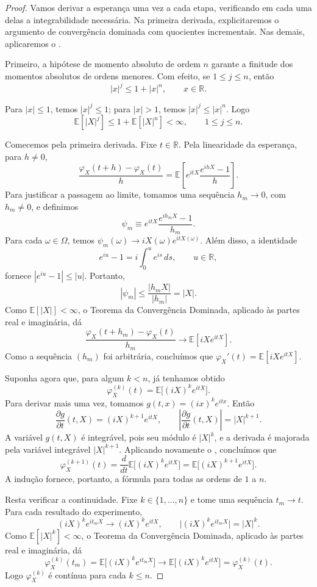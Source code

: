 \documentclass[12pt,portuguese]{article}
\theoremstyle{definition}
\theoremstyle{plainexercise}
\theoremstyle{starredexercise}
\theoremstyle{definition}
\begin{document}
\begin{proof}
Vamos derivar a esperança uma vez a cada etapa, verificando em cada
uma delas a integrabilidade necessária. Na primeira derivada, explicitaremos
o argumento de convergência dominada com quocientes incrementais.
Nas demais, aplicaremos o .

Primeiro, a hipótese de momento absoluto de ordem $n$ garante a finitude dos momentos
absolutos de ordens menores. Com efeito, se $1\leqslant j\leqslant n$, então
\[
|x|^j\leqslant1+|x|^n,\qquad x\in\mathbb{R}.
\]

Para $|x|\leqslant1$, temos $|x|^j\leqslant1$; para $|x|>1$, temos
$|x|^j\leqslant|x|^n$. Logo
\[
\mathbb{E}[|X|^j]\leqslant1+\mathbb{E}[|X|^n]<\infty,
\qquad 1\leqslant j\leqslant n.
\]

Comecemos pela primeira derivada. Fixe $t\in\mathbb{R}$.
Pela linearidade da esperança, para $h\neq0$,
\[
\frac{\varphi_X(t+h)-\varphi_X(t)}{h}
=\mathbb{E}\left[
e^{itX}\frac{e^{ihX}-1}{h}
\right].
\]
Para justificar a passagem ao limite, tomamos uma sequência
$h_m\to0$, com $h_m\neq0$, e definimos
\[
\psi_m\equiv e^{itX}\frac{e^{ih_mX}-1}{h_m}.
\]
Para cada $\omega\in\Omega$, temos
$\psi_m(\omega)\to iX(\omega)e^{itX(\omega)}$.
Além disso, a identidade
\[
e^{iu}-1=i\int_0^u e^{is}\,ds,
\qquad u\in\mathbb{R},
\]
fornece $|e^{iu}-1|\leqslant|u|$. Portanto,
\[
|\psi_m|
\leqslant\frac{|h_mX|}{|h_m|}
=|X|.
\]
Como $\mathbb{E}[|X|]<\infty$, o Teorema da Convergência Dominada, aplicado
às partes real e imaginária, dá
\[
\frac{\varphi_X(t+h_m)-\varphi_X(t)}{h_m}
\longrightarrow\mathbb{E}[iX e^{itX}].
\]
Como a sequência $(h_m)$ foi arbitrária, concluímos que
$\varphi_X'(t)=\mathbb{E}[iX e^{itX}]$.

Suponha agora que, para algum $k<n$, já tenhamos obtido
\[
\varphi_X^{(k)}(t)=\mathbb{E}\bigl[(iX)^k e^{itX}\bigr].
\]
Para derivar mais uma vez, tomamos $g(t,x)=(ix)^k e^{itx}$. Então
\[
\frac{\partial g}{\partial t}(t,X)
=(iX)^{k+1}e^{itX},
\qquad
\left|\frac{\partial g}{\partial t}(t,X)\right|
=|X|^{k+1}.
\]
A variável $g(t,X)$ é integrável, pois seu módulo é $|X|^k$, e a derivada é
majorada pela variável integrável $|X|^{k+1}$. Aplicando novamente o
, concluímos que
\[
\varphi_X^{(k+1)}(t)
=\frac{d}{dt}\mathbb{E}\bigl[(iX)^k e^{itX}\bigr]
=\mathbb{E}\bigl[(iX)^{k+1}e^{itX}\bigr].
\]
A indução fornece, portanto, a fórmula para todas as ordens de $1$ a $n$.

Resta verificar a continuidade. Fixe $k\in\{1,\ldots,n\}$ e tome uma
sequência $t_m\to t$. Para cada resultado do experimento,
\[
(iX)^k e^{it_mX}\longrightarrow(iX)^k e^{itX},
\qquad
\bigl|(iX)^k e^{it_mX}\bigr|=|X|^k.
\]
Como $\mathbb{E}[|X|^k]<\infty$, o Teorema da Convergência Dominada, aplicado às partes
real e imaginária, dá
\[
\varphi_X^{(k)}(t_m)
=\mathbb{E}\bigl[(iX)^k e^{it_mX}\bigr]
\longrightarrow
\mathbb{E}\bigl[(iX)^k e^{itX}\bigr]
=\varphi_X^{(k)}(t).
\]
Logo $\varphi_X^{(k)}$ é contínua para cada $k\leqslant n$.
\end{proof}
\end{document}
